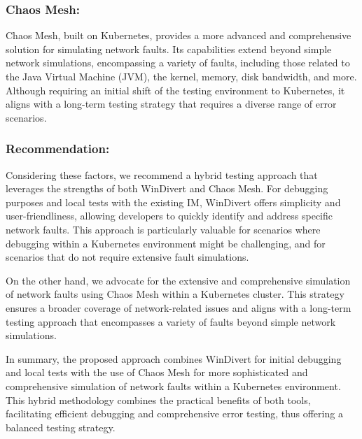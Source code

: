 \subsubsection{Chaos Mesh:}
Chaos Mesh, built on Kubernetes, provides a more advanced and comprehensive solution for simulating network faults. Its capabilities extend beyond simple network simulations, encompassing a variety of faults, including those related to the Java Virtual Machine (JVM), the kernel, memory, disk bandwidth, and more. Although requiring an initial shift of the testing environment to Kubernetes, it aligns with a long-term testing strategy that requires a diverse range of error scenarios.

\subsubsection{Recommendation:}
Considering these factors, we recommend a hybrid testing approach that leverages the strengths of both WinDivert and Chaos Mesh. For debugging purposes and local tests with the existing \ac{IM}, WinDivert offers simplicity and user-friendliness, allowing developers to quickly identify and address specific network faults. This approach is particularly valuable for scenarios where debugging within a Kubernetes environment might be challenging, and for scenarios that do not require extensive fault simulations.

On the other hand, we advocate for the extensive and comprehensive simulation of network faults using Chaos Mesh within a Kubernetes cluster. This strategy ensures a broader coverage of network-related issues and aligns with a long-term testing approach that encompasses a variety of faults beyond simple network simulations.

In summary, the proposed approach combines WinDivert for initial debugging and local tests with the use of Chaos Mesh for more sophisticated and comprehensive simulation of network faults within a Kubernetes environment. This hybrid methodology combines the practical benefits of both tools, facilitating efficient debugging and comprehensive error testing, thus offering a balanced testing strategy.